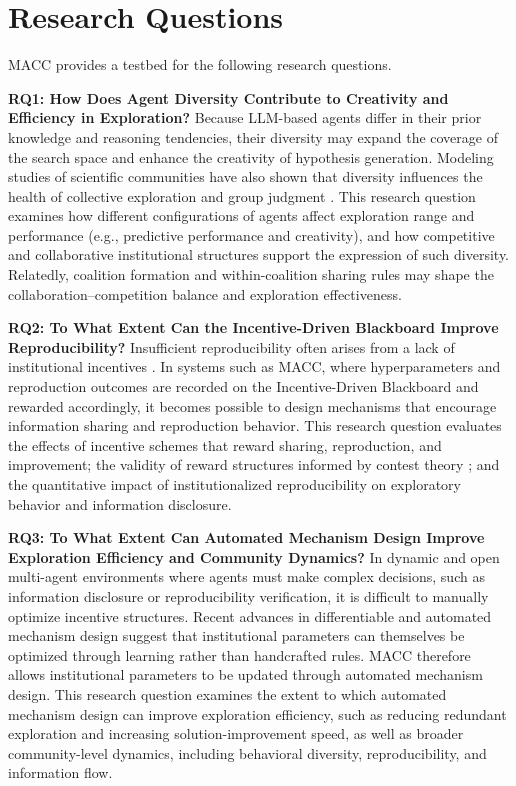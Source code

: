 \documentclass[sigconf]{aamas}
\begin{document}
\section{Research Questions}

MACC provides a testbed for the following research questions.

\textbf{RQ1: How Does Agent Diversity Contribute to Creativity and Efficiency in Exploration?}  
Because LLM-based agents differ in their prior knowledge and reasoning tendencies, their diversity may expand the coverage of the search space and enhance the creativity of hypothesis generation. Modeling studies of scientific communities have also shown that diversity influences the health of collective exploration and group judgment \cite{oconnor2023modelling}. This research question examines how different configurations of agents affect exploration range and performance (e.g., predictive performance and creativity), and how competitive and collaborative institutional structures support the expression of such diversity.
Relatedly, coalition formation and within-coalition sharing rules may shape the collaboration--competition balance and exploration effectiveness.

\textbf{RQ2: To What Extent Can the Incentive-Driven Blackboard Improve Reproducibility?}  
Insufficient reproducibility often arises from a lack of institutional incentives \cite{romero2020division}. In systems such as MACC, where hyperparameters and reproduction outcomes are recorded on the Incentive-Driven Blackboard and rewarded accordingly, it becomes possible to design mechanisms that encourage information sharing and reproduction behavior. This research question evaluates the effects of incentive schemes that reward sharing, reproduction, and improvement; the validity of reward structures informed by contest theory \cite{moldovanu2001optimal, moldovanu2006contest, dipalantino2009crowdsourcing}; and the quantitative impact of institutionalized reproducibility on exploratory behavior and information disclosure.

\textbf{RQ3: To What Extent Can Automated Mechanism Design Improve Exploration Efficiency and Community Dynamics?}
In dynamic and open multi-agent environments where agents must make complex decisions, such as information disclosure or reproducibility verification, it is difficult to manually optimize incentive structures. Recent advances in differentiable and automated mechanism design \cite{dutting2024optimal, Curry2025AMDSurvey} suggest that institutional parameters can themselves be optimized through learning rather than handcrafted rules. MACC therefore allows institutional parameters to be updated through automated mechanism design. This research question examines the extent to which automated mechanism design can improve exploration efficiency, such as reducing redundant exploration and increasing solution-improvement speed, as well as broader community-level dynamics, including behavioral diversity, reproducibility, and information flow.
\end{document}

